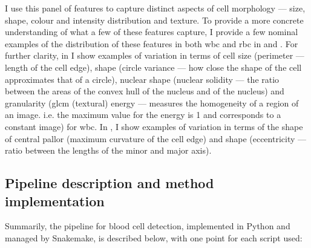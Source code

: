 I use this panel of features to capture distinct aspects of cell morphology --- size, shape, colour and intensity distribution and texture. To provide a more concrete understanding of what a few of these features capture, I provide a few nominal examples of the distribution of these features in both \ac{wbc} and \ac{rbc} in  and . For further clarity, in  I show examples of variation in terms of cell size (perimeter --- length of the cell edge), shape (circle variance --- how close the shape of the cell approximates that of a circle), nuclear shape (nuclear solidity --- the ratio between the areas of the convex hull of the nucleus and of the nucleus) and granularity (\ac{glcm} (textural) energy --- measures the homogeneity of a region of an image. i.e. the maximum value for the energy is 1 and corresponds to a constant image) for \ac{wbc}. In , I show examples of variation in terms of the shape of central pallor (maximum curvature of the cell edge) and shape (eccentricity --- ratio between the lengths of the minor and major axis).

\begin{figure}[!ht]
    \label{fig:feature-examples-wbc}
\end{figure}

\begin{figure}[!ht]
    \label{fig:feature-examples-rbc}
\end{figure}

\subsection{Pipeline description and method implementation}

Summarily, the pipeline for blood cell detection, implemented in Python and managed by Snakemake, is described below, with one point for each script used:

